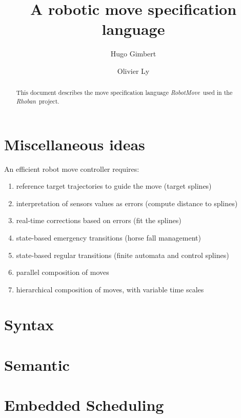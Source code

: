\documentclass[a4paper]{article}
\title{A robotic move specification language}
\author{Hugo Gimbert \and Olivier Ly}
\newcommand{\spec}{\emph{RobotMove}\ }
\newcommand{\rhoban}{\emph{Rhoban}\ }
\begin{document}
\maketitle

\begin{abstract}
This document describes the move specification language
\spec used
in the \rhoban project. 
\end{abstract}

\section{Miscellaneous ideas}

An efficient robot move controller requires:
\begin{enumerate}
  \item reference target trajectories to guide the move (target splines)
  \item interpretation of sensors values as errors (compute distance to splines)
  \item real-time corrections based on errors (fit the splines)
  \item state-based emergency transitions (horse fall management)
  \item state-based regular transitions (finite automata and control splines)
  \item parallel composition of moves
  \item hierarchical composition of moves, with variable time scales
\end{enumerate}

 

\section{Syntax}

\section{Semantic}

\section{Embedded Scheduling}
\end{document}
